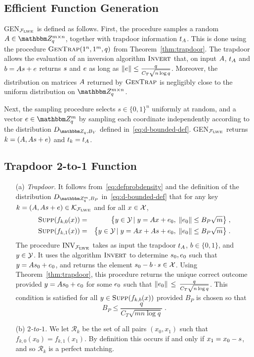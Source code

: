 \subsection{Efficient Function Generation}

GEN$_{\mathcal{F}_{\mathrm{LWE}}}$ is defined as follows. First, the procedure samples a random $\*A\in \mZ_q^{m\times n}$, together with trapdoor information $t_{\*A}$. This is done using the procedure $\textsc{GenTrap}(1^n,1^m,q)$ from Theorem~\ref{thm:trapdoor}. The trapdoor allows the evaluation of an inversion algorithm $\textsc{Invert}$  that, on input $\*A$, $t_{\*A}$ and $b=\*A\*s + \*e$ returns $\*s$ and $\*e$ as long as $\|\*e\|\leq \frac{q}{C_T\sqrt{n\log q}}$. Moreover, the distribution on matrices $\*A$ returned by $\textsc{GenTrap}$ is negligibly close to the uniform distribution on $\mZ_q^{m\times n}$.

Next, the sampling procedure selects $s\in \{0,1\}^n$ uniformly at random, and a vector $\*e\in \mZ_q^m$ by sampling each coordinate independently according to the distribution $D_{\mZ_q,B_V}$ defined in~\eqref{eq:d-bounded-def}. GEN$_{\mathcal{F}_{\mathrm{LWE}}}$ returns $k = (\*A,\*A\*s + \*e)$ and $t_k = t_{\*A}$. 


\subsection{Trapdoor 2-to-1 Function}\label{sec:trapdoortwotoonereq}

\begin{enumerate}
\item[(a)] \textit{Trapdoor.} It follows from~\eqref{eq:defprobdensity} and the definition of the distribution $D_{\mZ_q^m,B_P}$ in~\eqref{eq:d-bounded-def} that for any key $k=(\*A,\*A\*s+\*e)\in \mathcal{K}_{\mathcal{F}_{\lwe}}$ and for all $x\in \mathcal{X}$,
\begin{eqnarray}
\supp(f_{k,0}(x)) &=& \big\{y \in \sY \,|\; y = \*Ax + \*e_0, \; \|\*e_0\|\leq B_P\sqrt{m}\big\}\;,\label{eq:supportofpdf0}\\
\supp(f_{k,1}(x)) &=& \big\{y \in \sY\,|\; y = \*Ax + \*A\*s + \*e_0, \;\|\*e_0\|\leq B_P\sqrt{m}\big\}\;.\label{eq:supportofpdf1}
\end{eqnarray}
The procedure $\textrm{INV}_{\mathcal{F}_{\mathrm{LWE}}}$ takes as input the trapdoor $t_{\*A}$, $b\in\{0,1\}$, and $y\in \mathcal{Y}$. It uses the algorithm $\textsc{Invert}$ to determine $\*s_0,\*e_0$ such that $y = \*A\*s_0+\*e_0$, and returns the element $\*s_0 - b \cdot\*s\in\sX$. Using Theorem~\ref{thm:trapdoor}, this procedure returns the unique correct outcome provided $y = \*A\*s_0+\*e_0$ for some $\*e_0$ such that $  \|\*e_0\|  \,\leq\, \frac{q}{C_T\sqrt{n\log q}}$. This condition is satisfied for all $y\in \textsc{Supp}(f_{k,b}(x))$ provided $B_P$ is chosen so that
\begin{equation}\label{eq:trapdoortwotoonerequirement}
		 B_P \leq \frac{q}{C_T\sqrt{mn\log q}}\;.
\end{equation}
\item[(b)] \textit{$2$-to-$1$.} We let $\mathcal{R}_k$ be the set of all pairs $(x_0,x_1)$ such that $f_{k,0}(x_0) = f_{k,1}(x_1)$. By definition this occurs if and only if $x_1 = x_0 - \*s$, and so $\mathcal{R}_k$ is a perfect matching. 
\end{enumerate}


